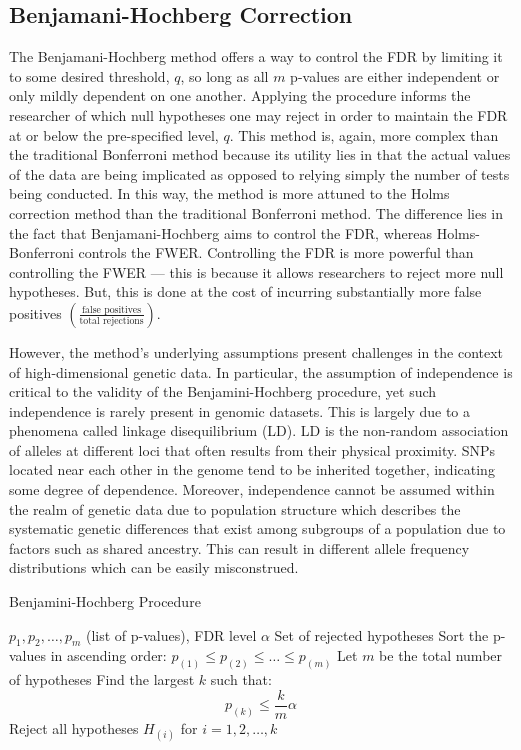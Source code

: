 \documentclass[12pt]{article}
\begin{document}
\subsection{Benjamani-Hochberg Correction}
The Benjamani-Hochberg method offers a way to control the FDR by limiting it to some desired threshold, $q$, so long as all $m$ p-values are either independent or only mildly dependent on one another. Applying the procedure informs the researcher of which null hypotheses one may reject in order to maintain the FDR at or below the pre-specified level, $q$. This method is, again, more complex than the traditional Bonferroni method because its utility lies in that the actual values of the data are being implicated as opposed to relying simply the number of tests being conducted. In this way, the method is more attuned to the Holms correction method than the traditional Bonferroni method. The difference lies in the fact that Benjamani-Hochberg aims to control the FDR, whereas Holms-Bonferroni controls the FWER. Controlling the FDR is more powerful than controlling the FWER — this is because it allows researchers to reject more null hypotheses. But, this is done at the cost of incurring substantially more false positives \(\left( \frac{\text{false positives}}{\text{total rejections}} \right)\). \par

However, the method’s underlying assumptions present challenges in the context of high-dimensional genetic data. In particular, the assumption of independence is critical to the validity of the Benjamini-Hochberg procedure, yet such independence is rarely present in genomic datasets. \cite{Rastaghi2024} This is largely due to a phenomena called linkage disequilibrium (LD). LD is the non-random association of alleles at different loci that often results from their physical proximity. SNPs located near each other in the genome tend to be inherited together, indicating some degree of dependence. \cite{Slatkin2008} Moreover, independence cannot be assumed within the realm of genetic data due to population structure which describes the systematic genetic differences that exist among subgroups of a population due to factors such as shared ancestry. This can result in different allele frequency distributions which can be easily misconstrued. \par


\begin{algorithm}
    \caption{Benjamini-Hochberg Procedure}
    \begin{algorithmic}[1]
        \Require $p_1, p_2, \dots, p_m$ (list of p-values), FDR level $\alpha$
        \Ensure Set of rejected hypotheses
        \State Sort the p-values in ascending order: $p_{(1)} \leq p_{(2)} \leq \dots \leq p_{(m)}$
        \State Let $m$ be the total number of hypotheses
        \State Find the largest $k$ such that:
        \[ p_{(k)} \leq \frac{k}{m} \alpha \]
        \State Reject all hypotheses $H_{(i)}$ for $i = 1, 2, \dots, k$
    \end{algorithmic}
\end{algorithm}
\end{document}
